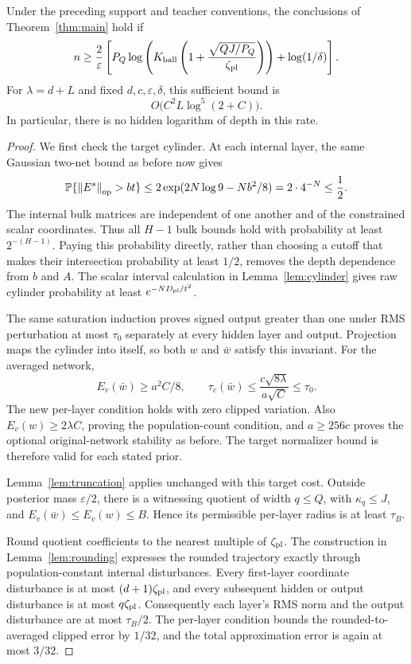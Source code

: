 \begin{theorem}
\label{thm:perlayer}
Under the preceding support and teacher conventions, the conclusions of
Theorem~\ref{thm:main} hold if
\begin{equation}\label{eq:perlayer-sample}
 n\ge\frac2\varepsilon\left[
 P_Q\log\left(K_{\rm ball}
       \left(1+\frac{\sqrt{QJ/P_Q}}{\zeta_{\rm pl}}\right)\right)
       +\log(1/\delta)\right].
\end{equation}
For $\lambda=d+L$ and fixed $d,c,\varepsilon,\delta$, this sufficient
bound is
\[
 O\bigl(C^2L\log^5(2+C)\bigr).
\]
In particular, there is no hidden logarithm of depth in this rate.
\end{theorem}

\begin{proof}
We first check the target cylinder. At each internal layer, the same
Gaussian two-net bound as before now gives
\[
 \mathbb P\{\left\|E^s\right\|_{\rm op}>bt\}
 \le2\exp(2N\log9-Nb^2/8)=2\cdot4^{-N}\le\frac12.
\]
The internal bulk matrices are independent of one another and of the
constrained scalar coordinates. Thus all $H-1$ bulk bounds hold with
probability at least $2^{-(H-1)}$. Paying this probability directly,
rather than choosing a cutoff that makes their intersection probability
at least $1/2$, removes the depth dependence from $b$ and $A$.
The scalar interval calculation in Lemma~\ref{lem:cylinder} gives raw
cylinder probability at least $e^{-ND_{\rm pl}/t^2}$.

The same saturation induction proves signed output greater than one under
RMS perturbation at most $\tau_0$ separately at every hidden layer and
output. Projection maps the cylinder into itself, so both $w$ and
$\bar w$ satisfy this invariant. For the averaged network,
\[
 E_v(\bar w)\ge a^2C/8,\qquad
 \tau_c(\bar w)\le\frac{c\sqrt{8\lambda}}{a\sqrt C}
                  \le\tau_0.
\]
The new per-layer condition holds with zero clipped variation. Also
$E_v(w)\ge2\lambda C$, proving the population-count condition, and
$a\ge256c$ proves the optional original-network stability as before.
The target normalizer bound is therefore valid for each stated prior.

Lemma~\ref{lem:truncation} applies unchanged with this target cost.
Outside posterior mass $\varepsilon/2$, there is a witnessing quotient
of width $q\le Q$, with $\kappa_q\le J$, and
$E_v(\bar w)\le E_v(w)\le B$. Hence its permissible per-layer radius
is at least $\tau_B$.

Round quotient coefficients to the nearest multiple of
$\zeta_{\rm pl}$. The construction in Lemma~\ref{lem:rounding}
expresses the rounded trajectory exactly through population-constant
internal disturbances. Every first-layer coordinate disturbance is at
most $(d+1)\zeta_{\rm pl}$, and every subsequent hidden or output
disturbance is at most $q\zeta_{\rm pl}$. Consequently each layer's RMS
norm and the output disturbance are at most $\tau_B/2$. The per-layer
condition bounds the rounded-to-averaged clipped error by $1/32$, and
the total approximation error is again at most $3/32$.


\end{proof}
